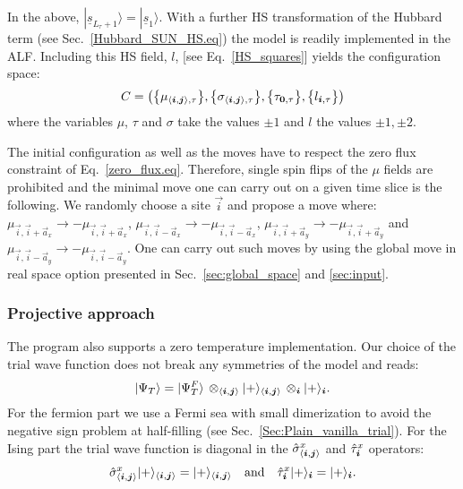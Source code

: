 In the above, $  | \underline{s}_{L_\tau+1}  \rangle  = | \underline{s}_{1}  \rangle   $.  With a further  HS transformation of the Hubbard term (see Sec.~\ref{Hubbard_SUN_HS.eq})  the model is readily implemented in the ALF.    Including this HS field, $l$,  [see Eq.~\eqref{HS_squares}] yields  the configuration space: 
\begin{equation}
	C = \left(  \big\{  \mu_{ \langle  \boldsymbol{i}, \boldsymbol{j} \rangle,\tau }  \big\},  \big\{  \sigma_{ \langle  \boldsymbol{i}, \boldsymbol{j} \rangle, \tau }  \big\},    \big\{ \tau_{\boldsymbol{0},\tau}  \big\},  \big\{ l_{\boldsymbol{i}, \tau}  \big\}  \right) 
\end{equation} 
where the variables $\mu$, $\tau$ and $\sigma$ take the values $\pm 1$  and $l$  the values $\pm1, \pm 2$. 

The initial configuration as well as the  moves have to respect the zero flux constraint of Eq.~\ref{zero_flux.eq}. Therefore, single spin flips of the $\mu$ fields  are prohibited and the minimal move one can carry out on  a given time slice is the following. We randomly choose a site $\vec{i} $ and  propose a move where:
$ \mu_{\vec{i},\vec{i} +  \vec{a}_x} \rightarrow - \mu_{\vec{i},\vec{i} +  \vec{a}_x} $,  $ \mu_{\vec{i},\vec{i} -  \vec{a}_x} \rightarrow - \mu_{\vec{i},\vec{i} -  \vec{a}_x} $,
$ \mu_{\vec{i},\vec{i} +  \vec{a}_y} \rightarrow - \mu_{\vec{i},\vec{i} +  \vec{a}_y} $ and $ \mu_{\vec{i},\vec{i} -  \vec{a}_y} \rightarrow - \mu_{\vec{i},\vec{i} -  \vec{a}_y} $.  One can carry out such moves by using the global move in real space option presented in Sec.~\ref{sec:global_space} and \ref{sec:input}.

\subsubsection{Projective approach} 
The program also supports a zero temperature implementation.
Our  choice  of the trial wave  function does not break any symmetries of the model and reads: 
\begin{equation}
	| \Psi_T \rangle  =    | \Psi^{F}_T \rangle \,  \otimes_{\langle \boldsymbol{i},\boldsymbol{j} \rangle}  | + \rangle_{\langle \boldsymbol{i},\boldsymbol{j} \rangle }     \,  \otimes_{ \boldsymbol{i} }  | + \rangle_{ \boldsymbol{i} }.   
\end{equation}
For the fermion part we use a Fermi sea with small dimerization to avoid the negative sign problem at half-filling (see Sec.~\ref{Sec:Plain_vanilla_trial}).  For the Ising part the trial   wave function  is diagonal in the $ \hat{\sigma}^{x}_{\langle \boldsymbol{i}, \boldsymbol{j} \rangle} $ and $\hat{\tau}^{x}_{\boldsymbol{i}} $   operators: 
\begin{equation}
	\hat{\sigma}^{x}_{\langle \boldsymbol{i}, \boldsymbol{j} \rangle}  | + \rangle_{\langle \boldsymbol{i},\boldsymbol{j} \rangle}  = | + \rangle_{\langle \boldsymbol{i},\boldsymbol{j} \rangle }  \quad\text{and}\quad  \hat{\tau}^{x}_{\boldsymbol{i}} | + \rangle_{ \boldsymbol{i} } = | + \rangle_{ \boldsymbol{i} }.
\end{equation}

